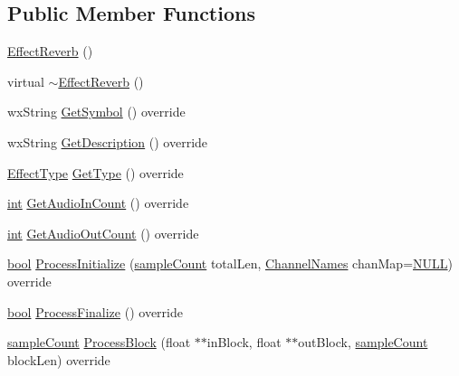\subsection*{Public Member Functions}
\begin{DoxyCompactItemize}
\item 
\hyperlink{class_effect_reverb_a6deaded9dc45cef39db9400ddeeef62e}{Effect\+Reverb} ()
\item 
virtual \hyperlink{class_effect_reverb_a1324e3500b3aa9fbc8c785186a302ad6}{$\sim$\+Effect\+Reverb} ()
\item 
wx\+String \hyperlink{class_effect_reverb_afa28e4b3c6822c11774a31838aab266e}{Get\+Symbol} () override
\item 
wx\+String \hyperlink{class_effect_reverb_a7ff6cebf23c2d56fc810fd6c4e3eca49}{Get\+Description} () override
\item 
\hyperlink{_effect_interface_8h_a4809a7bb3fd1a421902a667cc1405d43}{Effect\+Type} \hyperlink{class_effect_reverb_a2b12b938ed61e5d7dd4939b666bde8d4}{Get\+Type} () override
\item 
\hyperlink{xmltok_8h_a5a0d4a5641ce434f1d23533f2b2e6653}{int} \hyperlink{class_effect_reverb_a247ae7fa3c096b6ddadd6c17253292a2}{Get\+Audio\+In\+Count} () override
\item 
\hyperlink{xmltok_8h_a5a0d4a5641ce434f1d23533f2b2e6653}{int} \hyperlink{class_effect_reverb_ae9ae8f0c5dcbe7c8df0281819eedbc16}{Get\+Audio\+Out\+Count} () override
\item 
\hyperlink{mac_2config_2i386_2lib-src_2libsoxr_2soxr-config_8h_abb452686968e48b67397da5f97445f5b}{bool} \hyperlink{class_effect_reverb_a40ff16bd711333f714e3f452cceacfe4}{Process\+Initialize} (\hyperlink{include_2audacity_2_types_8h_afa427e1f521ea5ec12d054e8bd4d0f71}{sample\+Count} total\+Len, \hyperlink{include_2audacity_2_types_8h_a4f0f42a04250c39bbe0ce6cb26aa3b48}{Channel\+Names} chan\+Map=\hyperlink{px__mixer_8h_a070d2ce7b6bb7e5c05602aa8c308d0c4}{N\+U\+LL}) override
\item 
\hyperlink{mac_2config_2i386_2lib-src_2libsoxr_2soxr-config_8h_abb452686968e48b67397da5f97445f5b}{bool} \hyperlink{class_effect_reverb_a4eb45a70e63abe14e33abca7996f1a00}{Process\+Finalize} () override
\item 
\hyperlink{include_2audacity_2_types_8h_afa427e1f521ea5ec12d054e8bd4d0f71}{sample\+Count} \hyperlink{class_effect_reverb_a11ea653059b214c20e84fd8399cba42a}{Process\+Block} (float $\ast$$\ast$in\+Block, float $\ast$$\ast$out\+Block, \hyperlink{include_2audacity_2_types_8h_afa427e1f521ea5ec12d054e8bd4d0f71}{sample\+Count} block\+Len) override

\end{DoxyCompactItemize}
